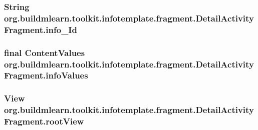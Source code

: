 \subsubsection[{\texorpdfstring{info\+\_\+\+Id}{info_Id}}]{\setlength{\rightskip}{0pt plus 5cm}String org.\+buildmlearn.\+toolkit.\+infotemplate.\+fragment.\+Detail\+Activity\+Fragment.\+info\+\_\+\+Id\hspace{0.3cm}{\ttfamily [private]}}\hypertarget{classorg_1_1buildmlearn_1_1toolkit_1_1infotemplate_1_1fragment_1_1DetailActivityFragment_af73685fcf9019fdd69ab2c6322ddc929}{}\label{classorg_1_1buildmlearn_1_1toolkit_1_1infotemplate_1_1fragment_1_1DetailActivityFragment_af73685fcf9019fdd69ab2c6322ddc929}
\subsubsection[{\texorpdfstring{info\+Values}{infoValues}}]{\setlength{\rightskip}{0pt plus 5cm}final Content\+Values org.\+buildmlearn.\+toolkit.\+infotemplate.\+fragment.\+Detail\+Activity\+Fragment.\+info\+Values\hspace{0.3cm}{\ttfamily [private]}}\hypertarget{classorg_1_1buildmlearn_1_1toolkit_1_1infotemplate_1_1fragment_1_1DetailActivityFragment_a0066a708cc32fde3ae05581017773f60}{}\label{classorg_1_1buildmlearn_1_1toolkit_1_1infotemplate_1_1fragment_1_1DetailActivityFragment_a0066a708cc32fde3ae05581017773f60}
\subsubsection[{\texorpdfstring{root\+View}{rootView}}]{\setlength{\rightskip}{0pt plus 5cm}View org.\+buildmlearn.\+toolkit.\+infotemplate.\+fragment.\+Detail\+Activity\+Fragment.\+root\+View\hspace{0.3cm}{\ttfamily [private]}}\hypertarget{classorg_1_1buildmlearn_1_1toolkit_1_1infotemplate_1_1fragment_1_1DetailActivityFragment_adc5f6819dcdcd513a8178de20a148a32}{}\label{classorg_1_1buildmlearn_1_1toolkit_1_1infotemplate_1_1fragment_1_1DetailActivityFragment_adc5f6819dcdcd513a8178de20a148a32}


